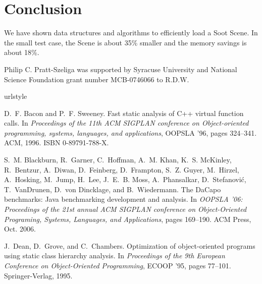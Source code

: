 \documentclass{sigplanconf}
\begin{document}
\section{Conclusion}
\label{sec:conclusion}
We have shown data structures and algorithms to efficiently load a Soot Scene. In the small test case, the Scene is about 35\% smaller and the memory savings is about 18\%.

\acks
Philip C. Pratt-Szeliga was supported by Syracuse University and National Science Foundation grant number MCB-0746066 to R.D.W.

%
%

\begin{thebibliography}{10}
\providecommand{\natexlab}[1]{#1}
\providecommand{\url}[1]{\texttt{#1}}
\expandafter\ifx\csname urlstyle\endcsname\relax
  \providecommand{\doi}[1]{doi: #1}\else
  \providecommand{\doi}{doi: \begingroup \urlstyle{rm}\Url}\fi

D.~F. Bacon and P.~F. Sweeney.
\newblock Fast static analysis of {C++} virtual function calls.
\newblock In \emph{Proceedings of the 11th ACM SIGPLAN conference on
  Object-oriented programming, systems, languages, and applications}, OOPSLA
  '96, pages 324--341. ACM, 1996.
\newblock ISBN 0-89791-788-X.

S.~M. Blackburn, R.~Garner, C.~Hoffman, A.~M. Khan, K.~S. McKinley, R.~Bentzur,
  A.~Diwan, D.~Feinberg, D.~Frampton, S.~Z. Guyer, M.~Hirzel, A.~Hosking,
  M.~Jump, H.~Lee, J.~E.~B. Moss, A.~Phansalkar, D.~Stefanovi\'{c},
  T.~{VanDrunen}, D.~von Dincklage, and B.~Wiedermann.
\newblock The {DaCapo} benchmarks: {J}ava benchmarking development and
  analysis.
\newblock In \emph{OOPSLA '06: Proceedings of the 21st annual ACM SIGPLAN
  conference on Object-Oriented Programing, Systems, Languages, and
  Applications}, pages 169--190. ACM Press, Oct. 2006.

J.~Dean, D.~Grove, and C.~Chambers.
\newblock Optimization of object-oriented programs using static class hierarchy
  analysis.
\newblock In \emph{Proceedings of the 9th European Conference on
  Object-Oriented Programming}, ECOOP '95, pages 77--101. Springer-Verlag,
  1995.


\end{thebibliography}
\end{document}
